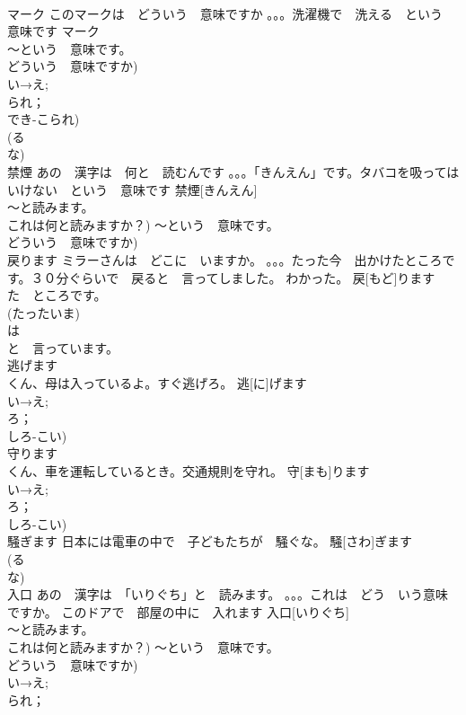 \documentclass[8pt]{extreport}
\begin{document}
\begin{CJK}{UTF8}{min}
\\	マーク	このマークは　どういう　意味ですか 。。。洗濯機で　洗える　という　意味です	マーク			
\\	～という　意味です。
\\	どういう　意味ですか) 
\\	い→え;
\\	られ；
\\	でき-こられ) 
\\	(る
\\	な)
\\	禁煙	あの　漢字は　何と　読むんです 。。。「きんえん」です。タバコを吸っては　いけない　という　意味です	禁煙[きんえん]			
\\	～と読みます。
\\	これは何と読みますか？) ～という　意味です。
\\	どういう　意味ですか)	
\\	戻ります	ミラーさんは　どこに　いますか。 。。。たった今　出かけたところです。３０分ぐらいで　戻ると　言ってしました。 わかった。	戻[もど]ります			
\\	た　ところです。　
\\	(たったいま) 
\\	は
\\	と　言っています。
\\	逃げます	
\\	くん、母は入っているよ。すぐ逃げろ。	逃[に]げます			
\\	い→え;
\\	ろ；
\\	しろ-こい)
\\	守ります	
\\	くん、車を運転しているとき。交通規則を守れ。	守[まも]ります			
\\	い→え;
\\	ろ；
\\	しろ-こい)
\\	騒ぎます	日本には電車の中で　子どもたちが　騒ぐな。	騒[さわ]ぎます			
\\	(る
\\	な)
\\	入口	あの　漢字は　「いりぐち」と　読みます。 。。。これは　どう　いう意味ですか。 このドアで　部屋の中に　入れます	入口[いりぐち]			
\\	～と読みます。
\\	これは何と読みますか？) ～という　意味です。
\\	どういう　意味ですか)	
\\	い→え;
\\	られ；

\end{CJK}
\end{document}
